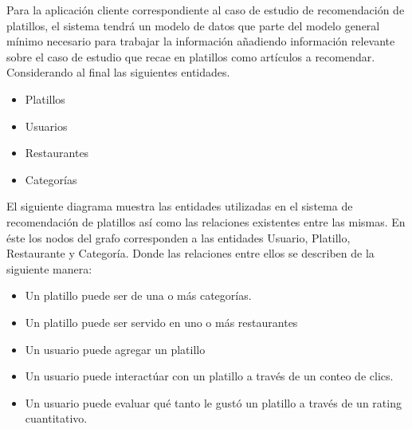       Para la aplicación cliente correspondiente al caso de estudio de recomendación de platillos, el sistema tendrá un modelo de datos que parte del modelo general mínimo necesario para trabajar la información añadiendo información relevante sobre el caso de estudio que recae en platillos como artículos a recomendar. Considerando al final las siguientes entidades.
      \begin{itemize}
        \item Platillos
        \item Usuarios
        \item Restaurantes
        \item Categorías
      \end{itemize}

      El siguiente diagrama muestra las entidades utilizadas en el sistema de recomendación de platillos así como las relaciones existentes entre las mismas. En éste los nodos del grafo corresponden a las entidades Usuario, Platillo, Restaurante y Categoría. Donde las relaciones entre ellos se describen de la siguiente manera: 
      \begin{itemize}
        \item Un platillo puede ser de una o más categorías.
        \item Un platillo puede ser servido en uno o más restaurantes
        \item Un usuario puede agregar un platillo
        \item Un usuario puede interactúar con un platillo a través de un conteo de clics.
        \item Un usuario puede evaluar qué tanto le gustó un platillo a través de un rating cuantitativo.
      \end{itemize} 


